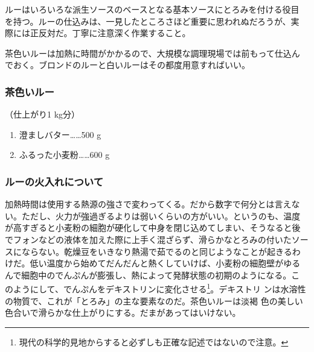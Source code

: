 
 

ルーはいろいろな派生ソースのベースとなる基本ソースにとろみを付ける役目
を持つ。ルーの仕込みは、一見したところさほど重要に思われぬだろうが、実
際には正反対だ。丁寧に注意深く作業すること。

茶色いルーは加熱に時間がかかるので、大規模な調理現場では前もって仕込ん
でおく。ブロンドのルーと白いルーはその都度用意すればいい。
\begin{recette}
\hypertarget{roux-brun}{%
\subsubsection{茶色いルー}\label{roux-brun}}


 

（仕上がり1 kg分）

\begin{enumerate}
\def\labelenumi{\arabic{enumi}.}
\tightlist
\item
  澄ましバター\ldots{}\ldots{}500 g
\item
  ふるった小麦粉\ldots{}\ldots{}600 g
\end{enumerate}

\hypertarget{cuisson-des-roux}{%
\subsubsection{ルーの火入れについて}\label{cuisson-des-roux}}


加熱時間は使用する熱源の強さで変わってくる。だから数字で何分とは言えな
い。ただし、火力が強過ぎるよりは弱いくらいの方がいい。というのも、温度
が高すぎると小麦粉の細胞が硬化して中身を閉じ込めてしまい、そうなると後
でフォンなどの液体を加えた際に上手く混ざらず、滑らかなとろみの付いたソー
スにならない。乾燥豆をいきなり熱湯で茹でるのと同じようなことが起きるわ
けだ。低い温度から始めてだんだんと熱くしていけば、小麦粉の細胞壁がゆる
んで細胞中のでんぷんが膨張し、熱によって発酵状態の初期のようになる。こ
のようにして、でんぷんをデキストリンに変化させる\footnote{現代の科学的見地からすると必ずしも正確な記述ではないので注意。}。デキストリ
ンは水溶性の物質で、これが「とろみ」の主な要素なのだ。茶色いルーは淡褐
色の美しい色合いで滑らかな仕上がりにする。だまがあってはいけない。


\end{recette}
